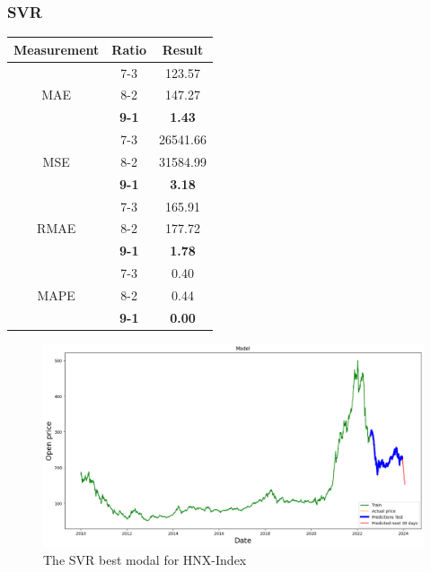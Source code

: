 \documentclass{ieeeojies}
\begin{document}
\subsubsection{SVR}
\begin{table}[H]
    \centering
    \begin{tabular}{|c|c|c|}
        \hline
         Measurement & Ratio &  Result  \\
        \hline
             & 7-3 & 123.57 \\
        MAE  & 8-2 & 147.27  \\
            & \textbf{{9-1}} & \textbf{{1.43}} \\
        \hline
           & 7-3 & 26541.66  \\
        MSE  & 8-2 & 31584.99 \\
            & \textbf{{9-1}} & \textbf{{3.18}}  \\
        \hline
           & 7-3 & 165.91 \\
        RMAE  & 8-2 & 177.72  \\
            & \textbf{{9-1}} & \textbf{{1.78}} \\
        \hline
           & 7-3 & 0.40  \\
        MAPE  & 8-2 & 0.44  \\
            & \textbf{{9-1}} & \textbf{{0.00}} \\
        \hline
    \end{tabular}
    \label{table:example}
\end{table}
\begin{figure}[H]
    \centering
    \includegraphics[width=0.8\linewidth]{SVR HNX 91.jpg}
    \caption{The SVR best modal for HNX-Index}
    \label{fig:example}
\end{figure}
\end{document}
